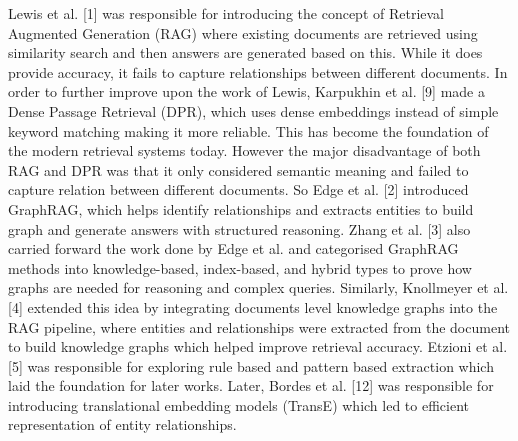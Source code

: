 \documentclass[10pt]{article}
\begin{document}
Lewis et al. [1] was responsible for introducing the concept of Retrieval Augmented Generation (RAG) where existing documents are retrieved using similarity search and then answers are generated based on this. While it does provide accuracy, it fails to capture relationships between different documents. In order to further improve upon the work of Lewis, Karpukhin et al. [9] made a Dense Passage Retrieval (DPR), which uses dense embeddings instead of simple keyword matching making it more reliable. This has become the foundation of the modern retrieval systems today. However the major disadvantage of both RAG and DPR was that it only considered semantic meaning and failed to capture relation between different documents. So Edge et al. [2] introduced GraphRAG, which helps identify relationships and extracts entities to build graph and generate answers with structured reasoning. Zhang et al. [3] also carried forward the work done by Edge et al. and categorised GraphRAG methods into knowledge-based, index-based, and hybrid types to prove how graphs are needed for reasoning and complex queries. Similarly, Knollmeyer et al. [4] extended this idea by integrating documents level knowledge graphs into the RAG pipeline, where entities and relationships were extracted from the document to build knowledge graphs which helped improve retrieval accuracy. Etzioni et al. [5] was responsible for exploring rule based and pattern based extraction which laid the foundation for later works. Later, Bordes et al. [12] was responsible for introducing translational embedding models (TransE) which led to efficient representation of entity relationships.
\end{document}
